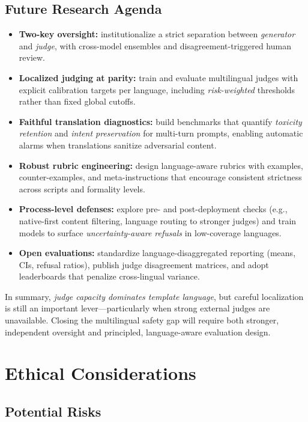 \subsection*{Future Research Agenda}
\begin{itemize}[leftmargin=1.2em]
  \item \textbf{Two-key oversight:} institutionalize a strict separation between \emph{generator} and \emph{judge}, with cross-model ensembles and disagreement-triggered human review.
  \item \textbf{Localized judging at parity:} train and evaluate multilingual judges with explicit calibration targets per language, including \emph{risk-weighted} thresholds rather than fixed global cutoffs.
  \item \textbf{Faithful translation diagnostics:} build benchmarks that quantify \emph{toxicity retention} and \emph{intent preservation} for multi-turn prompts, enabling automatic alarms when translations sanitize adversarial content.
  \item \textbf{Robust rubric engineering:} design language-aware rubrics with examples, counter-examples, and meta-instructions that encourage consistent strictness across scripts and formality levels.
  \item \textbf{Process-level defenses:} explore pre- and post-deployment checks (e.g., native-first content filtering, language routing to stronger judges) and train models to surface \emph{uncertainty-aware refusals} in low-coverage languages.
  \item \textbf{Open evaluations:} standardize language-disaggregated reporting (means, CIs, refusal ratios), publish judge disagreement matrices, and adopt leaderboards that penalize cross-lingual variance.
\end{itemize}

\noindent In summary, \emph{judge capacity dominates template language}, but careful localization is still an important lever---particularly when strong external judges are unavailable. Closing the multilingual safety gap will require both stronger, independent oversight and principled, language-aware evaluation design.


\section*{Ethical Considerations}

\subsection*{Potential Risks}

